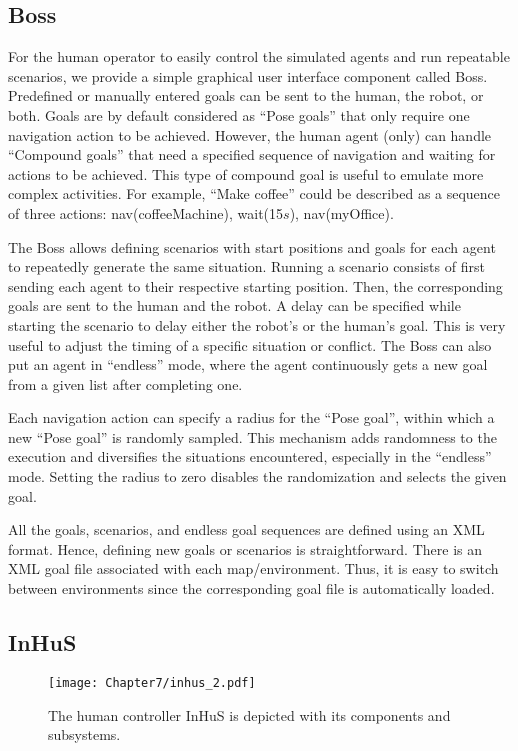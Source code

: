 \subsection{Boss}
For the human operator to easily control the simulated agents and run repeatable scenarios, we provide a simple graphical user interface component called Boss. Predefined or manually entered goals can be sent to the human, the robot, or both. Goals are by default considered as ``Pose goals'' that only require one navigation action to be achieved. However, the human agent (only) can handle ``Compound goals'' that need a specified sequence of navigation and waiting for actions to be achieved. This type of compound goal is useful to emulate more complex activities. For example, ``Make coffee'' could be described as a sequence of three actions: nav(coffeeMachine), wait(15$s$), nav(myOffice).

The Boss allows defining scenarios with start positions and goals for each agent to repeatedly generate the same situation. 
Running a scenario consists of first sending each agent to their respective starting position. Then, the corresponding goals are sent to the human and the robot.
A delay can be specified while starting the scenario to delay either the robot's or the human's goal. This is very useful to adjust the timing of a specific situation or conflict. The Boss can also put an agent in ``endless'' mode, where the agent continuously gets a new goal from a given list after completing one. 

Each navigation action can specify a radius for the ``Pose goal'', within which a new ``Pose goal'' is randomly sampled. This mechanism adds randomness to the execution and diversifies the situations encountered, especially in the ``endless'' mode. Setting the radius to zero disables the randomization and selects the given goal.

All the goals, scenarios, and endless goal sequences are defined using an XML format. Hence, defining new goals or scenarios is straightforward. There is an XML goal file associated with each map/environment. Thus, it is easy to switch between environments since the corresponding goal file is automatically loaded.


\subsection{InHuS}

\begin{figure}[b]
    \centering
    \texttt{[image: Chapter7/inhus\_2.pdf]}
    \caption{
    The human controller InHuS is depicted with its components and subsystems. 
    }
    \label{fig:inhus_only}
    \vspace{-1cm}
\end{figure}

